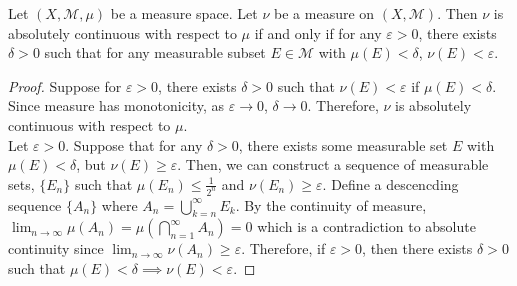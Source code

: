 \begin{theorem}
	Let $(X,\mathcal{M},\mu)$ be a measure space.
	Let $\nu$ be a measure on $(X,\mathcal{M})$.
	Then $\nu$ is absolutely continuous with respect to $\mu$ if and only if for any $\varepsilon > 0$, there exists $\delta > 0$ such that for any measurable subset $E \in \mathcal{M}$ with $\mu(E) < \delta$, $\nu(E) < \varepsilon$.
\end{theorem}
\begin{proof}
	Suppose for $\varepsilon > 0$, there exists $\delta > 0$ such that $\nu(E) < \varepsilon$ if $\mu(E) < \delta$.
	Since measure has monotonicity, as $\varepsilon \to 0$, $\delta \to 0$.
	Therefore, $\nu$ is absolutely continuous with respect to $\mu$.\\

	Let $\varepsilon > 0$.
	Suppose that for any $\delta > 0$, there exists some measurable set $E$ with $\mu(E) < \delta$, but $\nu(E) \ge \varepsilon$.
	Then, we can construct a sequence of measurable sets, $\{ E_n \}$ such that $\mu(E_n) \le \frac{1}{2^n}$ and $\nu(E_n) \ge \varepsilon$.
	Define a descencding sequence $\{ A_n \}$ where $\displaystyle A_n = \bigcup_{k = n}^\infty E_k$.
	By the continuity of measure, $\displaystyle \lim_{n \to \infty} \mu (A_n) = \mu \left( \bigcap_{n = 1}^\infty A_n \right) = 0$ which is a contradiction to absolute continuity since $\displaystyle \lim_{n \to \infty} \nu(A_n) \ge \varepsilon$.
	Therefore, if $\varepsilon > 0$, then there exists $\delta > 0$ such that $\mu(E) < \delta \implies \nu(E) < \varepsilon$.
\end{proof}


